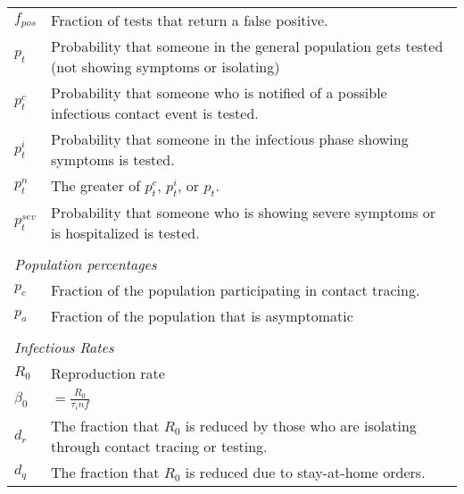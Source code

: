 \documentclass{article}
\begin{document}
\begin{table}[]
\begin{tabular}{ll}
$f_{pos}$                   & Fraction of tests that return a false positive.                                                    \\
$p_t$                       & Probability that someone in the general population gets tested (not showing symptoms or isolating) \\
$p^{c}_{t}$                 & Probability that someone who is notified of a possible infectious contact event is tested.         \\
$p^{i}_{t}$                 & Probability that someone in the infectious phase showing symptoms is tested.                       \\
$p^{n}_{t}$                 & The greater of $p^{c}_{t}$, $p^{i}_{t}$, or $p_{t}$.                                               \\
$p^{sev}_{t}$               & Probability that someone who is showing severe symptoms or is hospitalized is tested.              \\
                            &                                                                                                    \\
\multicolumn{2}{l}{\textit{Population percentages}}                                                                              \\
$p_{c}$                     & Fraction of the population participating in contact tracing.                                       \\
$p_{a}$                     & Fraction of the population that is asymptomatic                                                    \\
                            &                                                                                                    \\
\multicolumn{2}{l}{\textit{Infectious Rates}}                                                                                    \\
$R_{0}$                     & Reproduction rate                                                                                  \\
$\beta_{0}$                 & $= \frac{R_{0}}{\tau_inf}$                                                                         \\
$d_{r}$             & The fraction that $R_{0}$ is reduced by those who are isolating through contact tracing or testing.      \\
$d_{q}$                     & The fraction that $R_{0}$ is reduced due to stay-at-home orders.                                   \\

\end{tabular}
\end{table}
\end{document}
